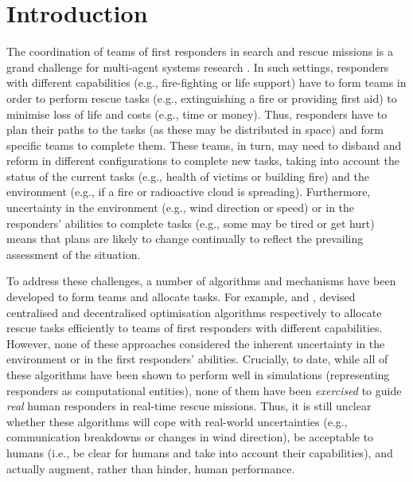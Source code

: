 \section{Introduction}
\noindent The coordination of teams of first responders in search and rescue missions is a grand challenge for multi-agent systems research \cite{kitano:2001}. In such settings, responders with different capabilities (e.g., fire-fighting or life support) have to form teams in order to perform rescue tasks (e.g., extinguishing a fire or providing first aid) to minimise  loss of life and costs (e.g., time or money). Thus, responders have to plan their paths to the tasks (as these may be distributed in space) and form specific teams  to complete them. These teams, in turn, may  need to disband and reform in different configurations to complete new tasks, taking into account the status  of the current tasks  (e.g., health of victims or building fire) and the environment (e.g., if a fire or radioactive cloud is spreading). Furthermore, uncertainty in the environment (e.g., wind direction or speed) or in the responders' abilities to complete tasks (e.g., some may be tired or get hurt) means that plans are likely to change continually to reflect the prevailing assessment of the situation. 

To address these challenges, a number of algorithms and mechanisms have been developed to form teams and allocate tasks. For example, \cite{ramchurn:etal:2010,Scerri2005} and \cite{Chapman2009}, devised centralised and decentralised optimisation algorithms respectively to allocate rescue tasks efficiently to teams of first responders with different capabilities. However, none of these approaches considered the inherent uncertainty in the environment or in the first responders' abilities. Crucially, to date, while all of these algorithms have been shown to perform well in simulations (representing responders as computational entities), none of them have been \emph{exercised} to guide \emph{real} human responders in real-time rescue missions. Thus, it is still unclear whether these algorithms will cope with real-world uncertainties (e.g., communication breakdowns or changes in wind direction), be acceptable to humans (i.e., be clear for humans and take into account their capabilities), and actually augment, rather than hinder,  human performance.
\\



